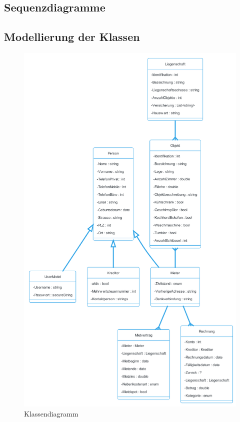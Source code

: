 \subsection{Sequenzdiagramme}
\subsection{Modellierung der Klassen}
\begin{figure}[H]
  \begin{center}
    \includegraphics[width=0.75\linewidth]{content/diagrams/out/classdiagramm/ImmoGlobal.png}
    \caption{Klassendiagramm}
  \end{center}
  \label{classdiag}
\end{figure}